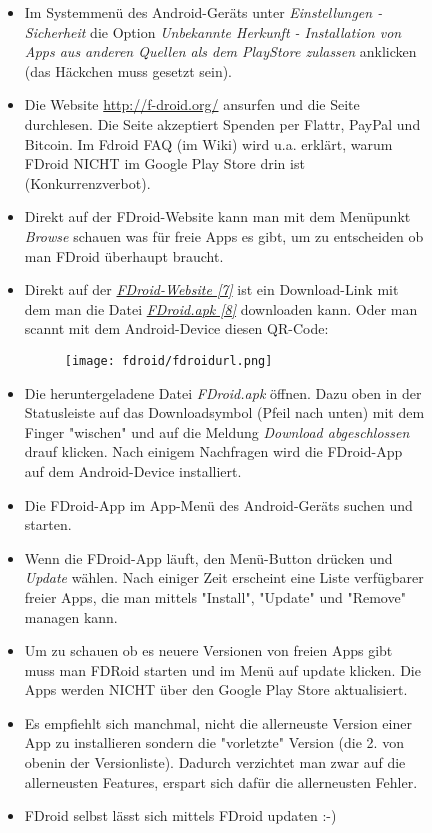 \documentclass[10pt,a4paper,ngerman,twoside]{article} %
\begin{document}
\begin{figure}
\begin{itemize}
\item Im Systemmenü des Android-Geräts unter \emph{Einstellungen - Sicherheit} die Option \emph{Unbekannte Herkunft - Installation von Apps aus anderen Quellen als dem PlayStore zulassen} anklicken (das Häckchen muss gesetzt sein).
\item Die Website \url{http://f-droid.org/} ansurfen und die Seite durchlesen. Die Seite akzeptiert Spenden per Flattr, PayPal und Bitcoin. Im Fdroid FAQ (im Wiki) wird u.a. erklärt, warum FDroid NICHT im Google Play Store drin ist (Konkurrenzverbot).
\item Direkt auf der FDroid-Website kann man mit dem Menüpunkt \emph{Browse} schauen was für freie Apps es gibt, um zu entscheiden ob man FDroid überhaupt braucht.
\item Direkt auf der \href{http://f-droid.org/}{\textit{FDroid-Website [7]}} ist ein Download-Link mit dem man die Datei \href{http://f-droid.org/FDroid.apk}{\textit{FDroid.apk [8]}} downloaden kann. Oder man scannt mit dem Android-Device diesen QR-Code:

\begin{figure}
\texttt{[image: fdroid/fdroidurl.png]}
\end{figure}

\item Die heruntergeladene Datei \emph{FDroid.apk} öffnen. Dazu oben in der Statusleiste auf das Downloadsymbol (Pfeil nach unten) mit dem Finger "wischen" und auf die Meldung \emph{Download abgeschlossen} drauf klicken. Nach einigem Nachfragen wird die FDroid-App auf dem Android-Device installiert.
\item Die FDroid-App im App-Menü des Android-Geräts suchen und starten.
\item Wenn die FDroid-App läuft, den Menü-Button drücken und \emph{Update} wählen. Nach einiger Zeit erscheint eine Liste verfügbarer freier Apps, die man mittels "Install", "Update" und "Remove" managen kann.
\item Um zu schauen ob es neuere Versionen von freien Apps gibt muss man FDRoid starten und im Menü auf update klicken. Die Apps werden NICHT über den Google Play Store aktualisiert.
\item Es empfiehlt sich manchmal, nicht die allerneuste Version einer App zu installieren sondern die "vorletzte" Version (die 2. von obenin der Versionliste). Dadurch verzichtet man zwar auf die allerneusten Features, erspart sich dafür die allerneusten Fehler.
\item FDroid selbst lässt sich mittels FDroid updaten :-)
\end{itemize}


\end{figure}
\end{document}
